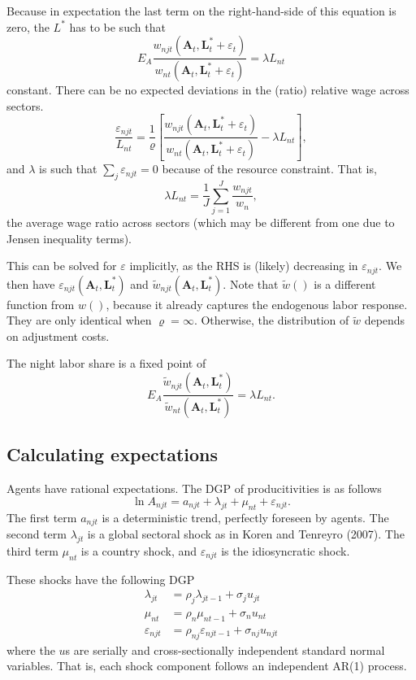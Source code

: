 \documentclass[12pt]{article}
\begin{document}
Because in expectation the last term on the right-hand-side of this equation is zero, the $L^*$ has to be such that
\[
E_{A}\frac 
	{w_{njt}(\mathbf A_{t}, \mathbf L_{t}^*+\varepsilon_t)}
	{w_{nt}(\mathbf A_{t}, \mathbf L_{t}^*+\varepsilon_t)}
= \lambda L_{nt}
\]
constant. There can be no expected deviations in the (ratio) relative wage across sectors. 
\begin{equation}\label{eq:varepsilon}
\frac {\varepsilon_{njt}} {L_{nt}}
=
\frac 1\varrho
\left[
\frac 
	{w_{njt}(\mathbf A_{t}, \mathbf L_{t}^*+\varepsilon_t)}
	{w_{nt}(\mathbf A_{t}, \mathbf L_{t}^*+\varepsilon_t)}
	-\lambda L_{nt}
\right],
\end{equation}
and $\lambda$ is such that $\sum_j\varepsilon_{njt}=0$ because of the resource constraint. That is, 
\[
\lambda L_{nt} = \frac1J \sum_{j=1}^{J} \frac{w_{njt}} {w_n},
\]
the average wage ratio across sectors (which may be different from one due to Jensen inequality terms).

This can be solved for $\varepsilon$ implicitly, as the RHS is (likely) decreasing in $\varepsilon_{njt}$. We then have $\varepsilon_{njt}(\mathbf A_t, \mathbf L_t^*)$ and $\tilde w_{njt}(\mathbf A_t, \mathbf L_t^*)$. Note that $\tilde w()$ is a different function from $w()$, because it already captures the endogenous labor response. They are only identical when $\varrho=\infty$. Otherwise, the distribution of $\tilde w$ depends on adjustment costs. 

The night labor share is a fixed point of
\[
E_{A}\frac 
	{\tilde w_{njt}(\mathbf A_{t}, \mathbf L_{t}^*)}
	{\tilde w_{nt}(\mathbf A_{t}, \mathbf L_{t}^*)}
= \lambda L_{nt}.
\]

\subsection{Calculating expectations}
Agents have rational expectations. The DGP of producitivities is as follows
\begin{equation}
	\ln A_{njt} = a_{njt}+\lambda_{jt} + \mu_{nt} +  \varepsilon_{njt}.
\end{equation}
The first term $a_{njt}$ is a deterministic trend, perfectly foreseen by agents. The second term $\lambda_{jt}$ is a global sectoral shock as in Koren and Tenreyro (2007). The third term $\mu_{nt}$ is a country shock, and $\varepsilon_{njt}$ is the idiosyncratic shock.

These shocks have the following DGP
\begin{align}
 	\lambda_{jt} &= \rho_{j}\lambda_{jt-1}+\sigma_{j}u_{jt}\\
 	\mu_{nt} &= \rho_{n}\mu_{nt-1}+\sigma_{n}u_{nt}\\
 	\varepsilon_{njt} &= \rho_{nj}\varepsilon_{njt-1}+\sigma_{nj}u_{njt}
\end{align} 
where the $u$s are serially and cross-sectionally independent standard normal variables. That is, each shock component follows an independent AR(1) process.
\end{document}
